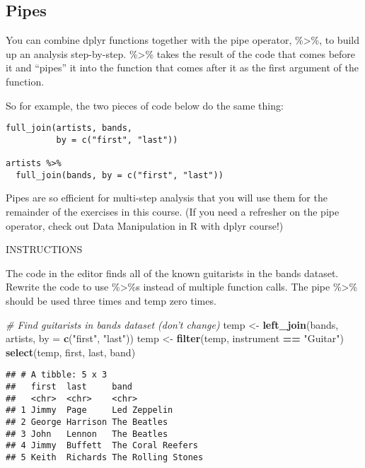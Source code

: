 \documentclass[]{article}
\newenvironment{Shaded}{\begin{snugshade}}{\end{snugshade}}
\newcommand{\KeywordTok}[1]{\textcolor[rgb]{0.13,0.29,0.53}{\textbf{#1}}}
\newcommand{\DataTypeTok}[1]{\textcolor[rgb]{0.13,0.29,0.53}{#1}}
\newcommand{\StringTok}[1]{\textcolor[rgb]{0.31,0.60,0.02}{#1}}
\newcommand{\CommentTok}[1]{\textcolor[rgb]{0.56,0.35,0.01}{\textit{#1}}}
\newcommand{\OperatorTok}[1]{\textcolor[rgb]{0.81,0.36,0.00}{\textbf{#1}}}
\newcommand{\NormalTok}[1]{#1}
\begin{document}
\subsection{Pipes}\label{pipes}

You can combine dplyr functions together with the pipe operator,
\%\textgreater{}\%, to build up an analysis step-by-step.
\%\textgreater{}\% takes the result of the code that comes before it and
``pipes'' it into the function that comes after it as the first argument
of the function.

So for example, the two pieces of code below do the same thing:

\begin{verbatim}
full_join(artists, bands, 
          by = c("first", "last"))

artists %>% 
  full_join(bands, by = c("first", "last"))
\end{verbatim}

Pipes are so efficient for multi-step analysis that you will use them
for the remainder of the exercises in this course. (If you need a
refresher on the pipe operator, check out Data Manipulation in R with
dplyr course!)

INSTRUCTIONS

The code in the editor finds all of the known guitarists in the bands
dataset. Rewrite the code to use \%\textgreater{}\%s instead of multiple
function calls. The pipe \%\textgreater{}\% should be used three times
and temp zero times.

\begin{Shaded}
\begin{Highlighting}[]
\CommentTok{# Find guitarists in bands dataset (don't change)}
\NormalTok{temp <-}\StringTok{ }\KeywordTok{left_join}\NormalTok{(bands, artists, }\DataTypeTok{by =} \KeywordTok{c}\NormalTok{(}\StringTok{"first"}\NormalTok{, }\StringTok{"last"}\NormalTok{))}
\NormalTok{temp <-}\StringTok{ }\KeywordTok{filter}\NormalTok{(temp, instrument }\OperatorTok{==}\StringTok{ "Guitar"}\NormalTok{)}
\KeywordTok{select}\NormalTok{(temp, first, last, band)}
\end{Highlighting}
\end{Shaded}

\begin{verbatim}
## # A tibble: 5 x 3
##   first  last     band              
##   <chr>  <chr>    <chr>             
## 1 Jimmy  Page     Led Zeppelin      
## 2 George Harrison The Beatles       
## 3 John   Lennon   The Beatles       
## 4 Jimmy  Buffett  The Coral Reefers 
## 5 Keith  Richards The Rolling Stones
\end{verbatim}
\end{document}
